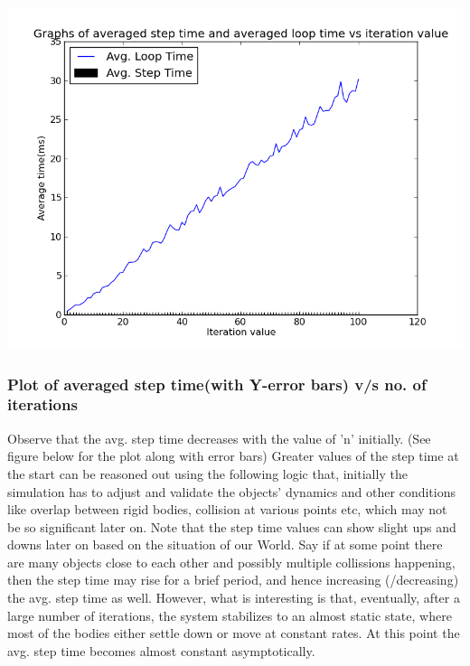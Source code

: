 \documentclass[11pt]{article}
\begin{document}
\begin{center} 
\includegraphics [scale=0.45]{./images/g29_plot01} 
\end{center}

\subsubsection{Plot of averaged step time(with Y-error bars) v/s no. of iterations}
Observe that the avg. step time decreases with the value of 'n' initially. (See figure below for the plot along with error bars) Greater values of the step time at the start can be reasoned out using the following logic that, initially the simulation has to adjust and validate the objects' dynamics and other conditions like overlap between rigid bodies, collision at various points etc, which may not be so significant later on. Note that the step time values can show slight ups and downs later on based on the situation of our World. Say if at some point there are many objects close to each other and possibly multiple collissions happening, then the step time may rise for a brief period, and hence increasing (/decreasing) the avg. step time as well. However, what is interesting is that, eventually, after a large number of iterations, the system stabilizes to an almost static state, where most of the bodies either settle down or move at constant rates. At this point the avg. step time becomes almost constant asymptotically.
\end{document}
